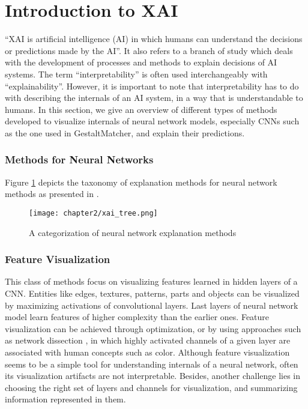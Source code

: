 \documentclass[../report.tex]{subfiles}
\begin{document}
    \section{Introduction to XAI}
	\enquote{XAI is artificial intelligence (AI) in which humans can understand the decisions or predictions made by the AI}\cite{vilone2021notions}. It also refers to a branch of study which deals with the development of processes and methods to explain decisions of AI systems. The term \enquote{interpretability} is often used interchangeably with \enquote{explainability}. However, it is important to note that interpretability has to do with describing the internals of an AI system, in a way that is understandable to humans. In this section, we give an overview of different types of methods developed to visualize internals of neural network models, especially CNNs such as the one used in GestaltMatcher, and explain their predictions.
	
	\subsubsection{Methods for Neural Networks} \label{sec_nn_methods}
	Figure \ref{fig_xai_tree} depicts the taxonomy of explanation methods for neural network methods as presented in \cite{molnar2019}. 
	  \begin{figure}[ht]
		\hspace*{1.0cm}      
		\texttt{[image: chapter2/xai\_tree.png]}
		\caption{A categorization of neural network explanation methods}
		\label{fig_xai_tree}
	\end{figure}
	\subsubsection{Feature Visualization}
	This class of methods focus on visualizing features learned in hidden layers of a CNN. Entities like edges, textures, patterns, parts and objects can be visualized by maximizing activations of convolutional layers. Last layers of neural network model learn features of higher complexity than the earlier ones.  Feature visualization can be achieved through optimization, or by using approaches such as network dissection \cite{bau2017network}, in which highly activated channels of a given layer are associated with human concepts such as color. Although feature visualization seems to be a simple tool for understanding internals of a neural network, often its visualization artifacts are not interpretable. Besides, another challenge lies in choosing the right set of layers and channels for visualization, and summarizing information represented in them.
\end{document}
